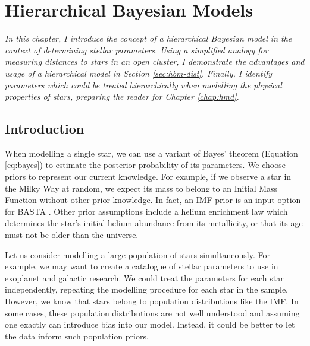 %
%
%
%
%
\chapter{Hierarchical Bayesian Models}\label{chap:hbm}

\textit{In this chapter, I introduce the concept of a hierarchical Bayesian model in the context of determining stellar parameters. Using a simplified analogy for measuring distances to stars in an open cluster, I demonstrate the advantages and usage of a hierarchical model in Section \ref{sec:hbm-dist}. Finally, I identify parameters which could be treated hierarchically when modelling the physical properties of stars, preparing the reader for Chapter \ref{chap:hmd}.}

\section{Introduction}

When modelling a single star, we can use a variant of Bayes' theorem (Equation \ref{eq:bayes}) to estimate the posterior probability of its parameters. We choose priors to represent our current knowledge. For example, if we observe a star in the Milky Way at random, we expect its mass to belong to an Initial Mass Function \citep[IMF; e.g.][]{Chabrier2003} without other prior knowledge. In fact, an IMF prior is an input option for BASTA \citep{AguirreBorsen-Koch.Rorsted.ea2022}. Other prior assumptions include a helium enrichment law which determines the star's initial helium abundance from its metallicity, or that its age must not be older than the universe.

Let us consider modelling a large population of stars simultaneously. For example, we may want to create a catalogue of stellar parameters to use in exoplanet and galactic research. We could treat the parameters for each star independently, repeating the modelling procedure for each star in the sample. However, we know that stars belong to population distributions like the IMF. In some cases, these population distributions are not well understood and assuming one exactly can introduce bias into our model. Instead, it could be better to let the data inform such population priors.

